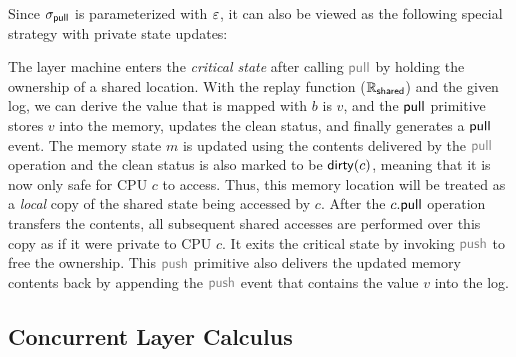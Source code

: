 Since $\sigma_{\mathsf{pull}}$ is parameterized with $\oracle$, it can also be viewed as the following special strategy  with private state updates:%
\begin{center}
\end{center}
The layer machine enters the \emph{critical state} after calling $\commc{pull}$ by holding the ownership
of a shared location.
With the replay function ($\mathbb{R}_{\mathsf{\textcolor{black}{shared}}}$) and the given log, 
we can derive the value that is mapped with $b$ is $v$, 
and the $\mathsf{pull}$ primitive
stores  $v$  into the memory, updates the clean status,
and finally generates a $\mathsf{pull}$ event.
The memory state $m$ is updated using the contents delivered
by the $\cpull$ operation
and  the clean status is also marked to be $\mathsf{\textcolor{black}{dirty}}(c)$,
meaning that it is now only safe for CPU $c$ to access.
Thus, this memory location will be treated as
a \emph{local}
copy of the shared state being accessed by $c$.
After the $c.\mathsf{pull}$ operation transfers the contents,
all subsequent shared accesses are performed over this 
copy as if it were private to CPU $c$.
It exits the critical state by invoking $\commc{push}$ to free the ownership.
This $\cpush$ primitive also delivers the updated memory contents back 
by appending the $\cpush$ event that contains the value $v$ into the log.

\subsection{Concurrent Layer Calculus}
\label{boot-linking}

